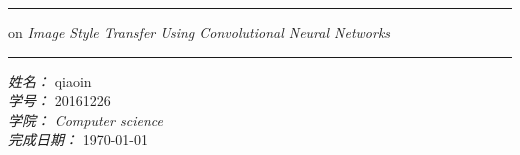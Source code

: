 \begin{titlepage}

	\begin{center}
	
		\null 
		
		\vspace*{7cm}
		
		\hrule
		\vspace*{0.5cm}
		{} 
		
		\vspace*{0.5cm}
		\begin{minipage}{0.5\textwidth}
			\begin{flushleft}
				on \textit{Image Style Transfer Using Convolutional Neural Networks \footnotemark }
			\end{flushleft}
		\end{minipage}
		\vspace*{0.5cm}
		\hrule
		
		\vspace*{6cm}
		
		\begin{minipage}{0.5\textwidth}
			\begin{flushleft}
			{\Large{
				\emph{姓名：} qiaoin \\
				\emph{学号：} 20161226 \\
				\emph{学院：} \textit{Computer science} \\
				\emph{完成日期：} \today \\ }} 
			\end{flushleft}
		\end{minipage}
	
	\end{center}
	
	
\end{titlepage}
